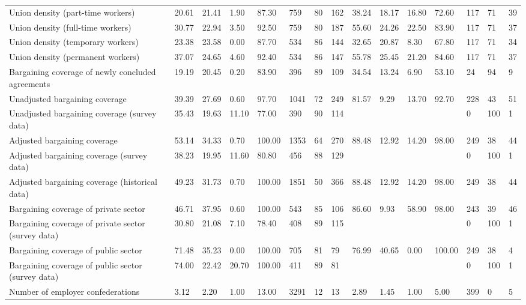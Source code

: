 \begin{longtable}{lllllllllllllll}
Union density (part-time workers) & 20.61 & 21.41 & 1.90 & 87.30 & 759 & 80 & 162 & 38.24 & 18.17 & 16.80 & 72.60 & 117 & 71 & 39\\
Union density (full-time workers) & 30.77 & 22.94 & 3.50 & 92.50 & 759 & 80 & 187 & 55.60 & 24.26 & 22.50 & 83.90 & 117 & 71 & 37\\
Union density (temporary workers) & 23.38 & 23.58 & 0.00 & 87.70 & 534 & 86 & 144 & 32.65 & 20.87 & 8.30 & 67.80 & 117 & 71 & 34\\
Union density (permanent workers) & 37.07 & 24.65 & 4.60 & 92.40 & 534 & 86 & 147 & 55.78 & 25.45 & 21.20 & 84.60 & 117 & 71 & 37\\
\addlinespace
Bargaining coverage of newly concluded agreements & 19.19 & 20.45 & 0.20 & 83.90 & 396 & 89 & 109 & 34.54 & 13.24 & 6.90 & 53.10 & 24 & 94 & 9\\
Unadjusted bargaining coverage & 39.39 & 27.69 & 0.60 & 97.70 & 1041 & 72 & 249 & 81.57 & 9.29 & 13.70 & 92.70 & 228 & 43 & 51\\
Unadjusted bargaining coverage (survey data) & 35.43 & 19.63 & 11.10 & 77.00 & 390 & 90 & 114 &  &  &  &  & 0 & 100 & 1\\
Adjusted bargaining coverage & 53.14 & 34.33 & 0.70 & 100.00 & 1353 & 64 & 270 & 88.48 & 12.92 & 14.20 & 98.00 & 249 & 38 & 44\\
Adjusted bargaining coverage (survey data) & 38.23 & 19.95 & 11.60 & 80.80 & 456 & 88 & 129 &  &  &  &  & 0 & 100 & 1\\
\addlinespace
Adjusted bargaining coverage (historical data) & 49.23 & 31.73 & 0.70 & 100.00 & 1851 & 50 & 366 & 88.48 & 12.92 & 14.20 & 98.00 & 249 & 38 & 44\\
Bargaining coverage of private sector & 46.71 & 37.95 & 0.60 & 100.00 & 543 & 85 & 106 & 86.60 & 9.93 & 58.90 & 98.00 & 243 & 39 & 46\\
Bargaining coverage of private sector (survey data) & 30.80 & 21.08 & 7.10 & 78.40 & 408 & 89 & 115 &  &  &  &  & 0 & 100 & 1\\
Bargaining coverage of public sector & 71.48 & 35.23 & 0.00 & 100.00 & 705 & 81 & 79 & 76.99 & 40.65 & 0.00 & 100.00 & 249 & 38 & 4\\
Bargaining coverage of public sector (survey data) & 74.00 & 22.42 & 20.70 & 100.00 & 411 & 89 & 81 &  &  &  &  & 0 & 100 & 1\\
\addlinespace
Number of employer confederations & 3.12 & 2.20 & 1.00 & 13.00 & 3291 & 12 & 13 & 2.89 & 1.45 & 1.00 & 5.00 & 399 & 0 & 5\\

\end{longtable}
